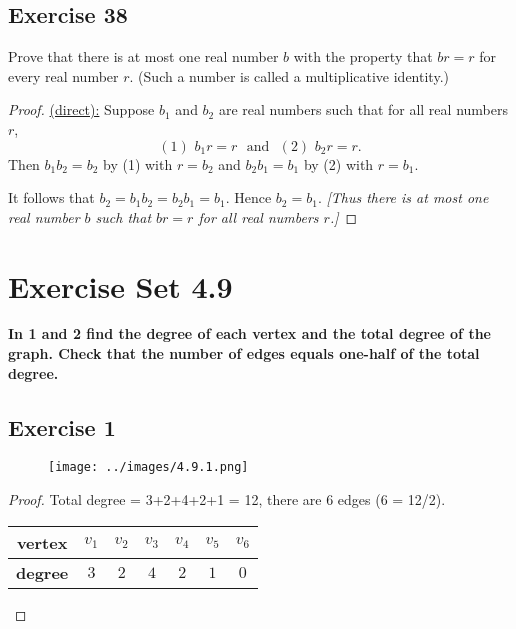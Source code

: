 \documentclass[14pt]{extarticle}
\newcommand{\cy}{\color{cyan}}
\begin{document}
\subsection{Exercise 38}
Prove that there is at most one real number $b$ with the property that $br = r$ for every real number $r$. (Such a number is called a multiplicative identity.)

\begin{proof}
    \underline{(direct):} Suppose $b_1$ and $b_2$ are real numbers such that for all real numbers $r$,
    \[
        (1) \,\, b_1 r = r \,\,\text{ and }\,\, (2) \,\, b_2 r = r.
    \]
    Then $b_1 b_2 = b_2$ by (1) with $r = b_2$ and $b_2 b_1 = b_1$ by (2) with $r = b_1$.

    It follows that $b_2 = b_1 b_2 = b_2 b_1 = b_1$. Hence $b_2 = b_1$. {\it [Thus there is at most one real number $b$ such that $br = r$ for all real numbers $r$.]}
\end{proof}

\section{Exercise Set 4.9}

 {\bf \cy In 1 and 2 find the degree of each vertex and the total degree of the graph. Check that the number of edges equals one-half of the total degree.}

\subsection{Exercise 1}
\begin{figure}[ht!]
    \centering
    \texttt{[image: ../images/4.9.1.png]}
\end{figure}

\begin{proof}
    Total degree = 3+2+4+2+1 = 12, there are 6 edges (6 = 12/2).
    \begin{center}
        \begin{tabular}{|c|c|c|c|c|c|c|}
            \hline
            {\bf vertex} & $v_1$ & $v_2$ & $v_3$ & $v_4$ & $v_5$ & $v_6$ \\
            \hline
            {\bf degree} & $3$   & $2$   & $4$   & $2$   & $1$   & $0$   \\
            \hline
        \end{tabular}
    \end{center}
\end{proof}
\end{document}
